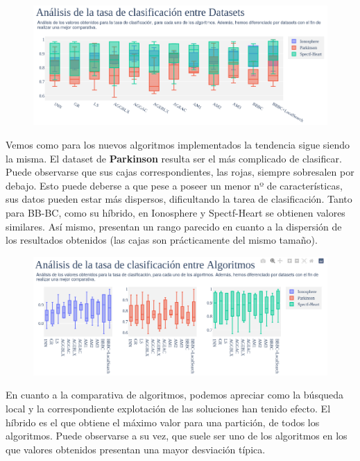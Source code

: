 \documentclass[10pt, a4paper]{article}
\theoremstyle{theorem-style}
\theoremstyle{theorem-style}
\theoremstyle{theorem2-style}
\theoremstyle{definition-style}
\theoremstyle{remark-style}
\theoremstyle{example-style}
\theoremstyle{definition-style}
\theoremstyle{remark-style}
\theoremstyle{remark-style}
\begin{document}
\pagebreak
\begin{figure}[htp]
\centering
\includegraphics[scale=0.4750]{Imagenes/clasificacion_datasets.png}
\label{}
\end{figure}

Vemos como para los nuevos algoritmos implementados la tendencia sigue siendo la misma. El dataset de \textbf{Parkinson} resulta ser el más complicado de clasificar. Puede observarse que sus cajas correspondientes, las rojas, siempre sobresalen por debajo. Esto puede deberse a que pese a poseer un menor nº de características, sus datos pueden estar más dispersos, dificultando la tarea de clasificación. Tanto para BB-BC, como su híbrido, en Ionosphere y Spectf-Heart se obtienen valores similares. Así mismo, presentan un rango parecido en cuanto a la dispersión de los resultados obtenidos (las cajas son prácticamente del mismo tamaño).

\begin{figure}[htp]
\centering
\includegraphics[scale=0.4750]{Imagenes/clasificacion_algoritmos.png}
\label{}
\end{figure}

En cuanto a la comparativa de algoritmos, podemos apreciar como la búsqueda local y la correspondiente explotación de las soluciones han tenido efecto. El híbrido es el que obtiene el máximo valor para una partición, de todos los algoritmos. Puede observarse a su vez, que suele ser uno de los algoritmos en los que valores obtenidos presentan una mayor desviación típica. 
\end{document}
